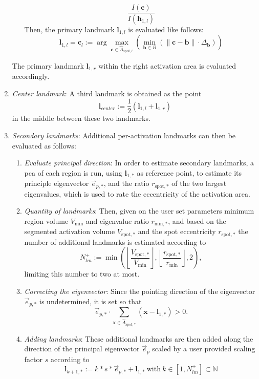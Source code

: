\documentclass{frontiers}
\newcommand{\emitem}[1]{\item \emph{#1}}
\newcommand{\vect}[1]{\ensuremath{\mathbf{#1}}}
\newcommand{\vx}{\vect{x}}
\newcommand{\lm}[1]{\ensuremath{\mathbf{l}_{#1}}}
\newcommand{\pc}{\ensuremath{\mathbf{c}}}
\newcommand{\pb}{\ensuremath{\mathbf{b}}}
\newcommand{\hp}[1]{\ensuremath{\mathbf{h}_{#1}}}
\newcounter{myalgorithm}
\newenvironment{myalgorithm}[1][]{%
  \begin{mdframed}[style=algstyle,frametitle={\refstepcounter{myalgorithm}Algorithm \themyalgorithm: #1}]%
}{%
  \end{mdframed}
}
\begin{document}
\begin{myalgorithm}[Extraction of landmarks related to activation areas\label{alg:lspots}]
\begin{enumerate}
\begin{enumerate}
\begin{equation}
                   \frac{I(\pc)}{I(\hp{1,l})}
  \end{equation}
  \noindent 
  Then, the primary landmark \lm{1,l} is evaluated like follows: 
  \begin{equation}
    \lm{1,l} = \pc_{l} := \arg \max_{ \pc\in\hat{A}_{\text{spot},l}}\left( \min_{\pb \in B}\left(\|\pc-\pb\| \cdot  \Delta_\pb \right)\right)
  \end{equation}
  \end{enumerate}
  \noindent 
  The primary landmark \lm{1,r} within the right activation area is evaluated accordingly. 
  \emitem{Center landmark}: A third  landmark is obtained as the point 
  \begin{equation}
  \label{eq:middle}
  \lm{center} := \frac{1}{2}\left(\lm{1,l} + \lm{1,r}\right)
  \end{equation}
  in the middle between these two landmarks.
  \emitem{Secondary landmarks}: Additional per-activation landmarks can then be evaluated as follows: 
  \begin{enumerate}
  \emitem{Evaluate principal direction}:
  In order to estimate secondary landmarks, a \gls*{pca} of each region is run, using \lm{1,*} as reference point, 
    to estimate its principle eigenvector $\vec{e}_{p,*}$, and the ratio $r_{\text{spot},*}$ of the two largest 
    eigenvalues, which is used to rate the eccentricity of the activation area. 
  \emitem{Quantity of landmarks}:
  Then, given on the user set parameters minimum region volume $V_{\text{min}}$ and eigenvalue ratio $r_{\text{min},*}$, 
    and based on the segmented activation volume $V_{\text{spot},*}$  and the spot eccentricity $r_{\text{spot},*}$
    the number of additional landmarks is estimated according to
  \begin{equation}
  \label{eq:nlm}
    N^+_{lm} := \min\left(  \left\lfloor \frac{ V_{\text{spot},*}}{V_{\text{min}}}\right\rfloor,
                   \left\lfloor \frac{ r_{\text{spot},*}}{r_{\text{min}}} \right\rfloor, 2\right), 
  \end{equation}
  \noindent 
  limiting this number to two at most. 
  \emitem{Correcting the eigenvector}: Since the pointing direction of the eigenvector $\vec{e}_{p,*}$ is undetermined,
    it is set so that 
  \begin{equation}
      \vec{e}_{p,*} \cdot \sum_{\vx \in \hat{A}_{\text{spot},*}}(\vx - \lm{1,*}) > 0. 
  \end{equation}
  \emitem{Adding landmarks}: 
  These additional landmarks are then added along the direction of the principal eigenvector $\vec{e}_p$ scaled by a user 
    provided scaling factor $s$ according to 
  \begin{equation}
  \label{eq:addlm}
  \lm{k+1,*} := k * s * \vec{e}_{p,*} + \lm{1,*} \: \text{with} \: k\in[1, N^+_{lm}]\subset \mathbb{N}
  \end{equation}
  \end{enumerate}
  \end{enumerate}
\end{myalgorithm}
\end{document}

